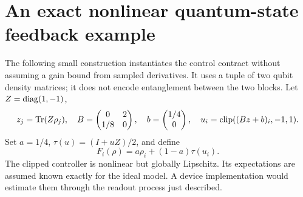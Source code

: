 \section{An exact nonlinear quantum-state feedback example}

The following small construction instantiates the control contract without
assuming a gain bound from sampled derivatives. It uses a tuple of two
qubit density matrices; it does not encode entanglement between the two
blocks. Let $Z=\operatorname{diag}(1,-1)$,
\[
 z_j=\operatorname{Tr}(Z\rho_j),\quad
 B=\begin{pmatrix}0&2\\1/8&0\end{pmatrix},\quad
 b=\begin{pmatrix}1/4\\0\end{pmatrix},\quad
 u_i=\operatorname{clip}((Bz+b)_i,-1,1).
\]
Set $a=1/4$, $\tau(u)=(I+uZ)/2$, and define
\begin{equation}\label{eq:qtf-feedback}
 F_i(\rho)=a\rho_i+(1-a)\tau(u_i).
\end{equation}
The clipped controller is nonlinear but globally Lipschitz. Its expectations
are assumed known exactly for the ideal model. A device implementation
would estimate them through the readout process just described.


